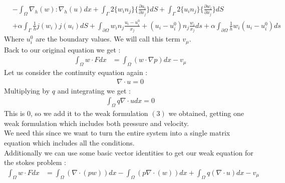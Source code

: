 \documentclass[11pt,twoside,a4paper]{article}
\begin{document}
\begin{align*}
&-  \int_\Omega \nabla_h(w) : \nabla_h(u) dx + \int_\Gamma 2 \{ w_i n_j \} \{ \frac{\partial u_i}{\partial x_j}\} dS + \int_\Gamma 2 \{ u_i n_j \} \{ \frac{\partial w_i}{\partial x_j}\} dS \\
&+ \alpha \int_\Gamma \frac{1}{h}  j(w_i) j(u_i) dS + \int_{\partial  \Omega} w_i n_j \frac{u_i - u^0_i}{x_j} + (u_i - u^0_i) n_j\frac{w_i}{x_j} ds + \alpha \int_{\partial \Omega} \frac{1}{h} w_i(u_i-u^0_i)ds
\end{align*}
Where $u^0_i$ are the boundary values.
We will call this term $v_\mu$.\\
Back to our original equation we get : 
\begin{align}
\int_\Omega w \cdot F dx &= \int_\Omega (w \cdot \nabla p) dx - v_\mu
\end{align}
Let us consider the continuity equation again :
\begin{align*}
\nabla \cdot u = 0
\end{align*}
Multiplying by $q$ and integrating we get :
\begin{align*}
\int_\Omega q \nabla \cdot u dx = 0
\end{align*}
This is $0$, so we add it to the weak formulation $(3)$ we obtained, getting one weak formulation which includes both pressure and velocity. \\
We need this since we want to turn the entire system into a single matrix equation which includes all the conditions.\\
Additionally we can use some basic vector identities to get our weak equation for the stokes problem :
\begin{align}
\int_\Omega w \cdot F dx &= \int_\Omega (\nabla \cdot (p w)) dx - \int_\Omega ( p \nabla \cdot (w)) dx + \int_\Omega q (\nabla \cdot u) dx  - v_\mu
\end{align}
\end{document}
